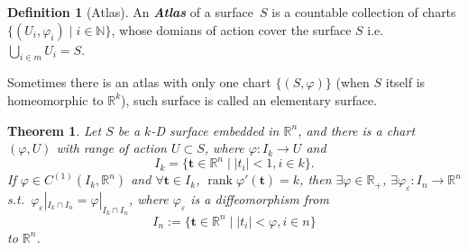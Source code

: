 \documentclass[openany]{book}
\newcommand*{\indexbf}[1]{\emph{\textbf{#1}}\index{#1}} %
\theoremstyle{plain}
\newtheorem{theorem}{Theorem}[section] %
\theoremstyle{definition}
\newtheorem{definition}{Definition}[section] %
\newcommand*{\bv}{\boldsymbol} %
\DeclareMathOperator{\rank}{rank}
\begin{document}
\begin{definition}[Atlas]
	An \indexbf{Atlas} of a surface~$S$ is a countable collection of charts $\{(U_i, \varphi_i) \mid i \in \mathbb N\}$, whose domians of action cover the surface $S$ i.e.\ $\bigcup_{i \in m} U_i = S$.
\end{definition}

Sometimes there is an atlas with only one chart $\{(S, \varphi)\}$ (when $S$ itself is homeomorphic to $\mathbb R^k$), such surface is called an elementary surface.

\begin{theorem}
	Let $S$ be a $k$-D surface embedded in $\mathbb R^n$, and there is a chart $(\varphi, U)$ with range of action $U \subset S$, where $\varphi \colon I_k \to U$ and
	\begin{equation*}
		I_k = \{ \bv t \in \mathbb R^n \mid |t_i| < 1, i \in k \}.
	\end{equation*} 
	If $\varphi \in C^{(1)}(I_k, \mathbb R^n)$ and $\forall \bv t \in I_k$, $\rank \varphi'(\bv t) = k$, then $\exists \varphi \in \mathbb R_+$, $\exists \varphi_\varepsilon \colon I_n \to \mathbb R^n$ s.t.\ $\varphi_\varepsilon |_{I_k \cap I_n} = \varphi |_{I_k \cap I_n}$, where $\varphi_\varepsilon$ is a diffeomorphism from
	\begin{equation*}
		I_n := \{\bv t \in \mathbb R^n \mid |t_i| < \varphi, i \in n\}
	\end{equation*}
	to $\mathbb R^n$.
\end{theorem}
\end{document}
